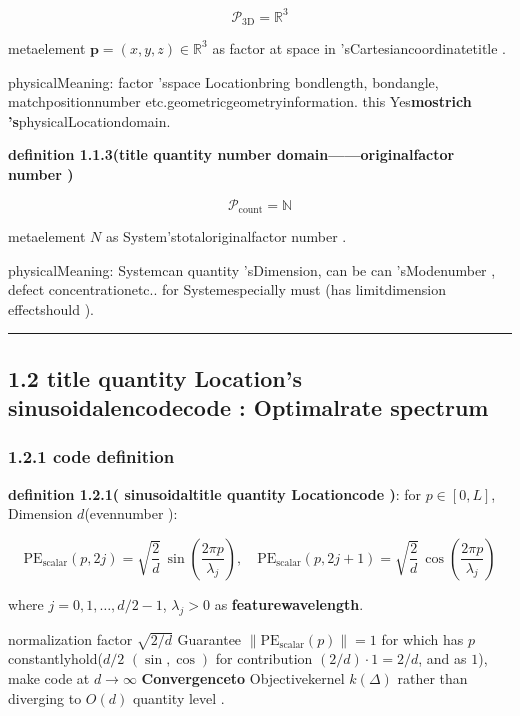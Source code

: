 \documentclass[
  12pt,
]{article}
\begin{document}
\[\mathcal{P}_{\text{3D}} = \mathbb{R}^3\]

metaelement \(\mathbf{p} = (x, y, z) \in \mathbb{R}^3\)
as factor at space in 'sCartesiancoordinatetitle . 

physicalMeaning: factor 'sspace Locationbring bondlength, bondangle, matchpositionnumber etc.geometricgeometryinformation. this Yes\textbf{mostrich 's}physicalLocationdomain. 

\textbf{definition  1.1.3(title quantity number domain------originalfactor number )}

\[\mathcal{P}_{\text{count}} = \mathbb{N}\]

metaelement \(N\) as System'stotaloriginalfactor number . 

physicalMeaning: Systemcan quantity 'sDimension, can be can 'sModenumber , defect concentrationetc.. for Systemespecially must (has limitdimension effectshould ). 

\begin{center}\rule{0.5\linewidth}{0.5pt}\end{center}

\subsection{1.2
title quantity Location's sinusoidalencodecode : Optimalrate spectrum}\label{ux6807ux91cfux4f4dux7f6eux7684ux6b63ux5f26ux7f16ux7801ux6700ux4f18ux9891ux7387ux8c31}

\subsubsection{1.2.1 code definition }\label{ux7f16ux7801ux5b9aux4e49}

\textbf{definition  1.2.1( sinusoidaltitle quantity Locationcode )}: for  \(p \in [0, L]\), Dimension
\(d\)(evennumber ):

\[\boxed{\text{PE}_{\text{scalar}}(p, 2j) = \sqrt{\frac{2}{d}}\,\sin\left(\frac{2\pi p}{\lambda_j}\right), \quad \text{PE}_{\text{scalar}}(p, 2j+1) = \sqrt{\frac{2}{d}}\,\cos\left(\frac{2\pi p}{\lambda_j}\right)}\]

where \(j = 0, 1, \ldots, d/2 - 1\), \(\lambda_j > 0\)
as \textbf{featurewavelength}. 

normalization factor  \(\sqrt{2/d}\) Guarantee
\(\|\text{PE}_{\text{scalar}}(p)\| = 1\) for which has  \(p\) constantlyhold(\(d/2\) 
\((\sin,\cos)\) for contribution  \((2/d) \cdot 1 = 2/d\), and as 
\(1\)), make code at  \(d \to \infty\) \textbf{Convergenceto }Objectivekernel
\(k(\Delta)\) rather than diverging to \(O(d)\) quantity level . 
\end{document}
